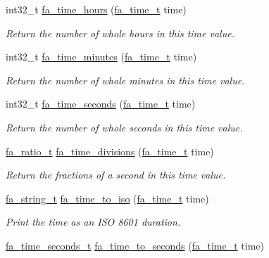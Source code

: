 \begin{DoxyCompactItemize}
int32\-\_\-t \hyperlink{group___fa_time_ga80523d01e327481b6ef4821725dd06dc}{fa\-\_\-time\-\_\-hours} (\hyperlink{group___fa_time_ga227cc693f20b4873fed11028bcade184}{fa\-\_\-time\-\_\-t} time)
\begin{DoxyCompactList}\small\item\em Return the number of whole hours in this time value. \end{DoxyCompactList}\item 
int32\-\_\-t \hyperlink{group___fa_time_gaa98eaf9f06048f5529a5b938eba9bb82}{fa\-\_\-time\-\_\-minutes} (\hyperlink{group___fa_time_ga227cc693f20b4873fed11028bcade184}{fa\-\_\-time\-\_\-t} time)
\begin{DoxyCompactList}\small\item\em Return the number of whole minutes in this time value. \end{DoxyCompactList}\item 
int32\-\_\-t \hyperlink{group___fa_time_gab0b34c9051a7f4ae5c8edcc175122491}{fa\-\_\-time\-\_\-seconds} (\hyperlink{group___fa_time_ga227cc693f20b4873fed11028bcade184}{fa\-\_\-time\-\_\-t} time)
\begin{DoxyCompactList}\small\item\em Return the number of whole seconds in this time value. \end{DoxyCompactList}\item 
\hyperlink{group___fa_ratio_gaf3b37b5fdfcccb6283b7ac806c72b273}{fa\-\_\-ratio\-\_\-t} \hyperlink{group___fa_time_gab05866bd3628f5965f4ab1d7da47158d}{fa\-\_\-time\-\_\-divisions} (\hyperlink{group___fa_time_ga227cc693f20b4873fed11028bcade184}{fa\-\_\-time\-\_\-t} time)
\begin{DoxyCompactList}\small\item\em Return the fractions of a second in this time value. \end{DoxyCompactList}\item 
\hyperlink{group___fa_string_gacada63033b77bc6c39fa632ae199349b}{fa\-\_\-string\-\_\-t} \hyperlink{group___fa_time_gad9e3686bc754369402057a1c67f5803e}{fa\-\_\-time\-\_\-to\-\_\-iso} (\hyperlink{group___fa_time_ga227cc693f20b4873fed11028bcade184}{fa\-\_\-time\-\_\-t} time)
\begin{DoxyCompactList}\small\item\em Print the time as an I\-S\-O 8601 duration. \end{DoxyCompactList}\item 
\hyperlink{group___fa_time_gaa8f8fedfa6f26ed6ad00d134c2aeb6b8}{fa\-\_\-time\-\_\-seconds\-\_\-t} \hyperlink{group___fa_time_ga0f26dd4a53948a84fdf0ff6000396c5e}{fa\-\_\-time\-\_\-to\-\_\-seconds} (\hyperlink{group___fa_time_ga227cc693f20b4873fed11028bcade184}{fa\-\_\-time\-\_\-t} time)

\end{DoxyCompactItemize}
